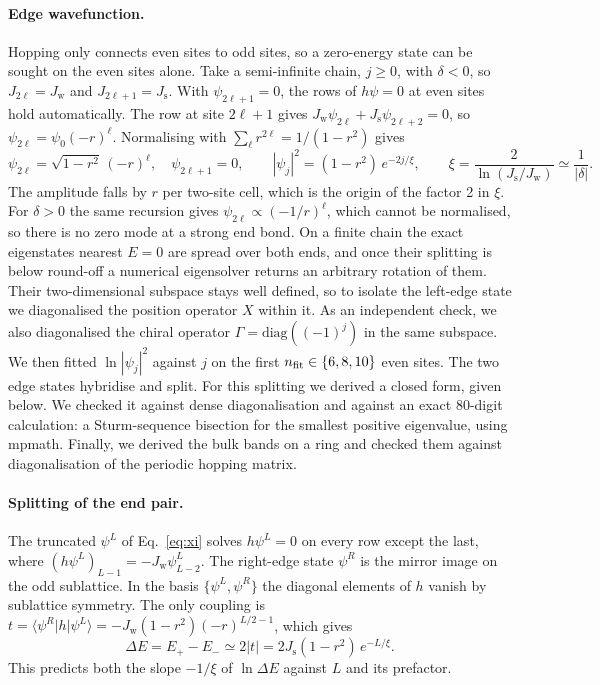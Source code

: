 \documentclass[11pt,a4paper]{article}
\newcommand{\Jw}{J_{\mathrm{w}}}
\newcommand{\Js}{J_{\mathrm{s}}}
\begin{document}
\paragraph{Edge wavefunction.}
Hopping only connects even sites to odd sites, so a zero-energy state can be sought on the even sites alone.
Take a semi-infinite chain, $j\ge0$, with $\delta<0$, so $J_{2\ell}=\Jw$ and $J_{2\ell+1}=\Js$.
With $\psi_{2\ell+1}=0$, the rows of $h\psi=0$ at even sites hold automatically.
The row at site $2\ell+1$ gives $\Jw\psi_{2\ell}+\Js\psi_{2\ell+2}=0$, so $\psi_{2\ell}=\psi_0(-r)^\ell$.
Normalising with $\sum_\ell r^{2\ell}=1/(1-r^2)$ gives
\begin{equation}
  \psi_{2\ell} = \sqrt{1-r^2}\,(-r)^\ell,\quad \psi_{2\ell+1}=0,
  \qquad |\psi_j|^2 = (1-r^2)\,e^{-2j/\xi},\qquad \xi = \frac{2}{\ln(\Js/\Jw)} \simeq \frac{1}{|\delta|}.
  \label{eq:xi}
\end{equation}
The amplitude falls by $r$ per two-site cell, which is the origin of the factor 2 in $\xi$.
For $\delta>0$ the same recursion gives $\psi_{2\ell}\propto(-1/r)^\ell$, which cannot be normalised, so there is no zero mode at a strong end bond.
On a finite chain the exact eigenstates nearest $E=0$ are spread over both ends, and once their splitting is below round-off a numerical eigensolver returns an arbitrary rotation of them.
Their two-dimensional subspace stays well defined, so to isolate the left-edge state we diagonalised the position operator $X$ within it.
As an independent check, we also diagonalised the chiral operator $\Gamma=\mathrm{diag}((-1)^j)$ in the same subspace.
We then fitted $\ln|\psi_j|^2$ against $j$ on the first $n_{\rm fit}\in\{6,8,10\}$ even sites.
The two edge states hybridise and split.
For this splitting we derived a closed form, given below.
We checked it against dense diagonalisation and against an exact 80-digit calculation: a Sturm-sequence bisection for the smallest positive eigenvalue, using mpmath.
Finally, we derived the bulk bands on a ring and checked them against diagonalisation of the periodic hopping matrix.

\paragraph{Splitting of the end pair.}
The truncated $\psi^L$ of Eq.~\eqref{eq:xi} solves $h\psi^L=0$ on every row except the last, where $(h\psi^L)_{L-1} = -\Jw\psi^L_{L-2}$.
The right-edge state $\psi^R$ is the mirror image on the odd sublattice.
In the basis $\{\psi^L,\psi^R\}$ the diagonal elements of $h$ vanish by sublattice symmetry.
The only coupling is $t = \langle\psi^R|h|\psi^L\rangle = -\Jw(1-r^2)(-r)^{L/2-1}$, which gives
\begin{equation}
  \Delta E = E_+-E_- \simeq 2|t| = 2\Js(1-r^2)\,e^{-L/\xi}.
  \label{eq:splitting}
\end{equation}
This predicts both the slope $-1/\xi$ of $\ln\Delta E$ against $L$ and its prefactor.
\end{document}
